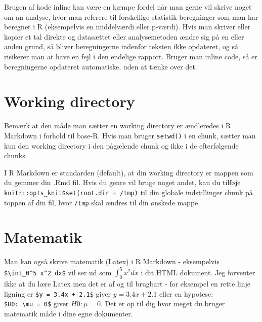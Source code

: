 \documentclass[
]{book}
\newenvironment{Shaded}{\begin{snugshade}}{\end{snugshade}}
\newcommand{\InformationTok}[1]{\textcolor[rgb]{0.56,0.35,0.01}{\textbf{\textit{#1}}}}
\begin{document}
Brugen af kode inline kan være en kæmpe fordel når man gerne vil skrive noget om an analyse, hvor man referere til forskellige statistik beregninger som man har beregnet i R (eksempelvis en middelværdi eller p-værdi). Hvis man skriver eller kopier et tal direkte og datasættet eller analysemetoden ændre sig på en eller anden grund, så bliver beregningerne indenfor teksten ikke opdateret, og så risikerer man at have en fejl i den endelige rapport. Bruger man inline code, så er beregningerne opdateret automatiske, uden at tænke over det.

\hypertarget{working-directory-1}{%
\section{Working directory}\label{working-directory-1}}

Bemærk at den måde man sætter en working directory er ændleredes i R Markdown i forhold til base-R. Hvis man bruger \texttt{setwd()} i en chunk, sætter man kun den working directory i den pågælende chunk og ikke i de efterfølgende chunks.

I R Markdown er standarden (default), at din working directory er mappen som du gemmer din .Rmd fil. Hvis du genre vil bruge noget andet, kan du tilføje \texttt{knitr::opts\_knit\$set(root.dir\ =\ \textquotesingle{}/tmp\textquotesingle{})} til din globale indstillinger chunk på toppen af din fil, hvor \texttt{\textquotesingle{}/tmp\textquotesingle{}} skal ændres til din ønskede mappe.

\begin{Shaded}
\end{Shaded}

\hypertarget{matematik}{%
\section{Matematik}\label{matematik}}

Man kan også skrive matematik (Latex) i R Markdown - eksempelvis \texttt{\$\textbackslash{}int\_0\^{}5\ x\^{}2\ dx\$} vil ser ud som \(\int_0^5 x^2 dx\) i dit HTML dokument. Jeg forventer ikke at du lære Latex men det er af og til brugbart - for eksempel en rette linje ligning er \texttt{\$y\ =\ 3.4x\ +\ 2.1\$} giver \(y = 3.4x + 2.1\) eller en hypotese: \texttt{\$H0:\ \textbackslash{}mu\ =\ 0\$} giver \(H0: \mu = 0\). Det er op til dig hvor meget du bruger matematik måde i dine egne dokumenter.
\end{document}
